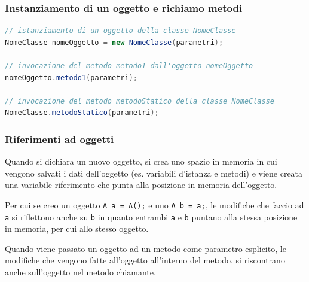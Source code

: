 \documentclass{article}
\begin{document}
\subsubsection*{Instanziamento di un oggetto e richiamo metodi}
\begin{lstlisting}[language=Java]
// istanziamento di un oggetto della classe NomeClasse
NomeClasse nomeOggetto = new NomeClasse(parametri);

// invocazione del metodo metodo1 dall'oggetto nomeOggetto
nomeOggetto.metodo1(parametri);

// invocazione del metodo metodoStatico della classe NomeClasse
NomeClasse.metodoStatico(parametri);
\end{lstlisting}

\subsubsection*{Riferimenti ad oggetti}
Quando si dichiara un nuovo oggetto, si crea uno spazio in memoria in cui vengono salvati i dati dell'oggetto (es. variabili
d'istanza e metodi) e viene creata una variabile riferimento che punta alla posizione in memoria dell'oggetto.

Per cui se creo un oggetto \verb|A a = A();| e uno \verb|A b = a;|, le modifiche che faccio ad \verb|a| si riflettono anche
su \verb|b| in quanto entrambi \verb|a| e \verb|b| puntano alla stessa posizione in memoria, per cui allo stesso oggetto.

Quando viene passato un oggetto ad un metodo come parametro esplicito, le modifiche che vengono fatte all'oggetto all'interno
del metodo, si riscontrano anche sull'oggetto nel metodo chiamante.
\end{document}
